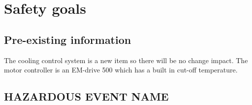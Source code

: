 \section{Safety goals}
%
%
%

\subsection{Pre-existing information}
%

The cooling control system is a new item so there will be no change impact.
The motor controller is an EM-drive 500 which has a built in cut-off temperature.

\subsection{HAZARDOUS EVENT NAME}
%
%
%
%
%
%

